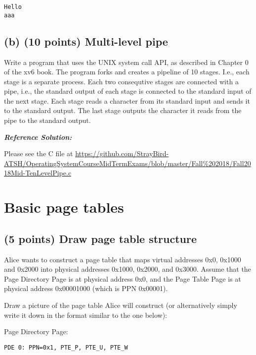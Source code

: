 \documentclass[]{article}
\begin{document}
\begin{verbatim}
Hello
aaa
\end{verbatim}

\hypertarget{b-10-points-multi-level-pipe}{%
\subsection{(b) (10 points) Multi-level
pipe}\label{b-10-points-multi-level-pipe}}

Write a program that uses the UNIX system call API, as described in
Chapter 0 of the xv6 book. The program forks and creates a pipeline of
10 stages. I.e., each stage is a separate process. Each two consequtive
stages are connected with a pipe, i.e., the standard output of each
stage is connected to the standard input of the next stage. Each stage
reads a character from its standard input and sends it to the standard
output. The last stage outputs the character it reads from the pipe to
the standard output.

\textbf{\emph{Reference Solution:}}

Please see the C file at
\url{https://github.com/StrayBird-ATSH/OperatingSystemCourseMidTermExams/blob/master/Fall\%202018/Fall2018Mid-TenLevelPipe.c}

\hypertarget{basic-page-tables}{%
\section{Basic page tables}\label{basic-page-tables}}

\hypertarget{points-draw-page-table-structure}{%
\subsection{(5 points) Draw page table
structure}\label{points-draw-page-table-structure}}

Alice wants to construct a page table that maps virtual addresses 0x0,
0x1000 and 0x2000 into physical addresses 0x1000, 0x2000, and 0x3000.
Assume that the Page Directory Page is at physical address 0x0, and the
Page Table Page is at physical address 0x00001000 (which is PPN
0x00001).

Draw a picture of the page table Alice will construct (or alternatively
simply write it down in the format similar to the one below):

Page Directory Page:

\texttt{PDE\ 0:\ PPN=0x1,\ PTE\_P,\ PTE\_U,\ PTE\_W}
\end{document}
